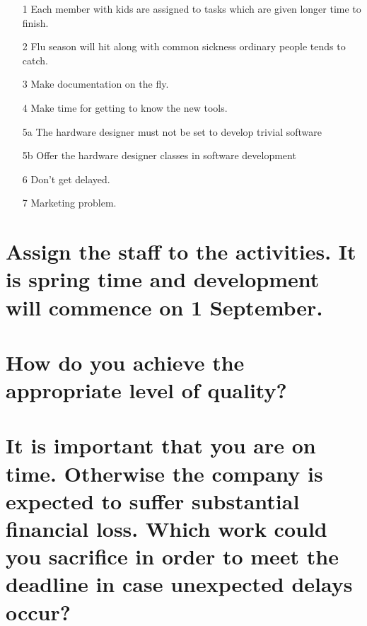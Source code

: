 \documentclass[10pt, a4]{article}
\begin{document}
\begin{itemize}
	\item[1] Each member with kids are assigned to tasks which are given longer time to finish.
	\item[2] Flu season will hit along with common sickness ordinary people tends to catch.
	\item[3] Make documentation on the fly.
	\item[4] Make time for getting to know the new tools.
	\item[5a] The hardware designer must not be set to develop trivial software
	\item[5b] Offer the hardware designer classes in software development
	\item[6] Don't get delayed.
	\item[7] Marketing problem.
\end{itemize}

\section{Assign the staff to the activities. It is spring time and development will commence on 1 September.}



\section{How do you achieve the appropriate level of quality?}



\section{It is important that you are on time. 
Otherwise the company is expected to suffer substantial financial loss. 
	Which work could you sacrifice in order to meet the deadline in case unexpected delays occur?}
\end{document}
